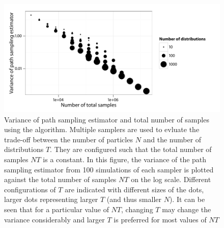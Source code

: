 \begin{figure}[t]
  \linespread{1.1}\selectfont
  \includegraphics[width=\linewidth]{fig_src/Particle_Iter_Var}
  \caption[Variance of path sampling estimator and total number of samples
  using \protect\smc algorithm]
  {Variance of path sampling estimator and total number of samples using the
    \smc[2] algorithm. Multiple samplers are used to evluate the trade-off
    between the number of particles $N$ and the number of distributions $T$.
    They are configured such that the total number of samples $NT$ is a
    constant. In this figure, the variance of the path sampling estimator from
    100 simulations of each sampler is plotted against the total number of
    samples $NT$ on the log scale. Different configurations of $T$ are
    indicated with different sizes of the dots, larger dots representing
    larger $T$ (and thus smaller $N$). It can be seen that for a particular
    value of $NT$, changing $T$ may change the variance considerably and
    larger $T$ is preferred for most values of $NT$}
  \label{fig:particle iter num}
\end{figure}
